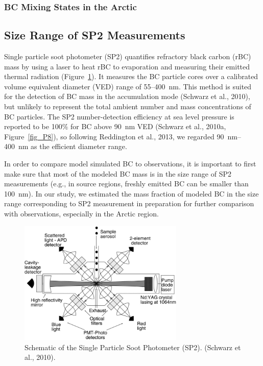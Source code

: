 \documentclass[12pt]{article}
\begin{document}
	\subsubsection{BC Mixing States in the Arctic}
	
	
	
	\subsection{Size Range of SP2 Measurements}
		Single particle soot photometer (SP2) quantifies refractory black carbon (rBC) mass by using a laser to heat rBC to evaporation and measuring their emitted thermal radiation (Figure~\ref{fig_P9}). It measures the BC particle cores over a calibrated volume equivalent diameter (VED) range of 55--400~nm. This method is suited for the detection of BC mass in the accumulation mode (Schwarz et al., 2010), but unlikely to represent the total ambient number and mass concentrations of BC particles. The SP2 number-detection efficiency at sea level pressure is reported to be 100$\%$ for BC above 90~nm VED (Schwarz et al., 2010a, Figure~\ref{fig_P8}), so following Reddington et al., 2013, we regarded 90~nm--400~nm as the efficient diameter range.
		
		In order to compare model simulated BC to observations, it is important to first make sure that most of the modeled BC mass is in the size range of SP2 measurements (e.g., in source regions, freshly emitted BC can be smaller than 100~nm). In our study, we estimated the mass fraction of modeled BC in the size range corresponding to SP2 measurement in preparation for further comparison with observations, especially in the Arctic region.
		
		 \begin{figure}[H] 
		 	\begin{center}
		 		\includegraphics[width = 0.7\textwidth]{Figure09}
		 		\caption[]{\label{fig_P9} Schematic of the Single Particle Soot Photometer (SP2). (Schwarz et al., 2010).}
		 	\end{center}
		 \end{figure}
		 
\end{document}
